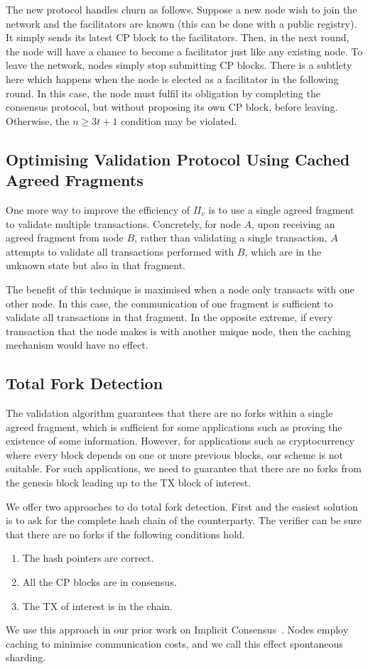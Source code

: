 The new protocol handles churn as follows.
Suppose a new node wish to join the network and the facilitators are known (this can be done with a public registry).
It simply sends its latest CP block to the facilitators.
Then, in the next round, the node will have a chance to become a facilitator just like any existing node.
To leave the network, nodes simply stop submitting CP blocks.
There is a subtlety here which happens when the node is elected as a facilitator in the following round.
In this case, the node must fulfil its obligation by completing the consensus protocol, but without proposing its own CP block, before leaving.
Otherwise, the $n \ge 3t + 1$ condition may be violated.

\subsection{Optimising Validation Protocol Using Cached Agreed Fragments}
\label{sec:caching}
One more way to improve the efficiency of $\Pi_v$ is to use a single agreed fragment to validate multiple transactions.
Concretely, for node $A$, upon receiving an agreed fragment from node $B$,
rather than validating a single transaction,
$A$ attempts to validate all transactions performed with $B$, which are in the unknown state but also in that fragment.

The benefit of this technique is maximised when a node only transacts with one other node.
In this case, the communication of one fragment is sufficient to validate all transactions in that fragment.
In the opposite extreme, if every transaction that the node makes is with another unique node,
then the caching mechanism would have no effect.

\subsection{Total Fork Detection}
\label{sec:fork}
The validation algorithm guarantees that there are no forks within a single agreed fragment,
which is sufficient for some applications such as proving the existence of some information.
However, for applications such as cryptocurrency where every block depends on one or more previous blocks,
our scheme is not suitable.
For such applications, we need to guarantee that there are no forks from the genesis block leading up to the TX block of interest.

We offer two approaches to do total fork detection.
First and the easiest solution is to ask for the complete hash chain of the counterparty.
The verifier can be sure that there are no forks if the following conditions hold.
\begin{enumerate}
    \item The hash pointers are correct.
    \item All the CP blocks are in consensus.
    \item The TX of interest is in the chain.
\end{enumerate}
We use this approach in our prior work on Implicit Consensus~\cite{implicitconsensus}.
Nodes employ caching to minimise communication costs, and we call this effect spontaneous sharding.


